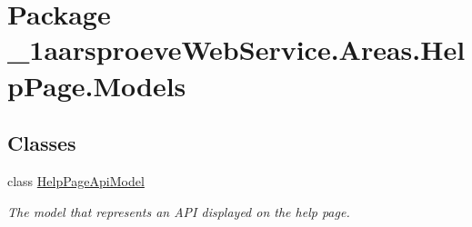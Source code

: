 \hypertarget{namespace__1aarsproeve_web_service_1_1_areas_1_1_help_page_1_1_models}{}\section{Package \+\_\+1aarsproeve\+Web\+Service.\+Areas.\+Help\+Page.\+Models}
\label{namespace__1aarsproeve_web_service_1_1_areas_1_1_help_page_1_1_models}
\subsection*{Classes}
\begin{DoxyCompactItemize}
\item 
class \hyperlink{class__1aarsproeve_web_service_1_1_areas_1_1_help_page_1_1_models_1_1_help_page_api_model}{Help\+Page\+Api\+Model}
\begin{DoxyCompactList}\small\item\em The model that represents an A\+P\+I displayed on the help page. \end{DoxyCompactList}\end{DoxyCompactItemize}
